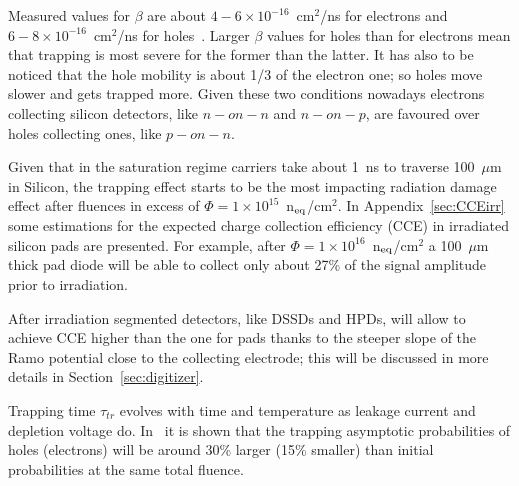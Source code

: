 Measured values for $\beta$ are about $4-6\times10^{-16}$~cm$^2$/ns for electrons 
and $6-8\times10^{-16}$~cm$^2$/ns for holes~\cite{KRAMBERGER2002297}. Larger $\beta$ 
values for holes than for electrons mean that trapping is most severe for the former than the latter. 
It has also to be noticed that the hole mobility is about 1/3 of the electron one; so holes move 
slower and gets trapped more. Given these two conditions nowadays electrons collecting 
silicon detectors, like $n-on-n$ and $n-on-p$, are favoured over holes collecting ones, like
 $p-on-n$.  

Given that in the saturation regime carriers take about 1~ns to traverse 100~$\mu$m in Silicon, 
the trapping effect starts to be the most impacting radiation damage effect after fluences in excess of $
\Phi=1\times10^{15}$~n$_{\rm eq}$/cm$^2$. In Appendix~\ref{sec:CCEirr} some estimations 
for the expected charge collection efficiency (CCE) in irradiated silicon pads are presented. 
For example, after  $\Phi=1\times10^{16}$~n$_{\rm eq}$/cm$^2$ a 100~$\mu$m thick pad diode 
will be able to collect only about 27\% of the signal amplitude prior to irradiation.

After irradiation segmented detectors, like DSSDs and HPDs, will allow to achieve CCE higher than 
the one for pads thanks to the steeper slope of the Ramo potential close to the collecting electrode; 
this will be discussed in more details in Section~\ref{sec:digitizer}.

Trapping time $\tau_{tr}$ evolves with time and temperature as leakage current and depletion voltage 
do. In~\cite{KRAMBERGER2007762} it is shown that the trapping asymptotic probabilities  of
holes (electrons) will be around 30\% larger (15\% smaller)
than initial probabilities at the same total fluence.

   
